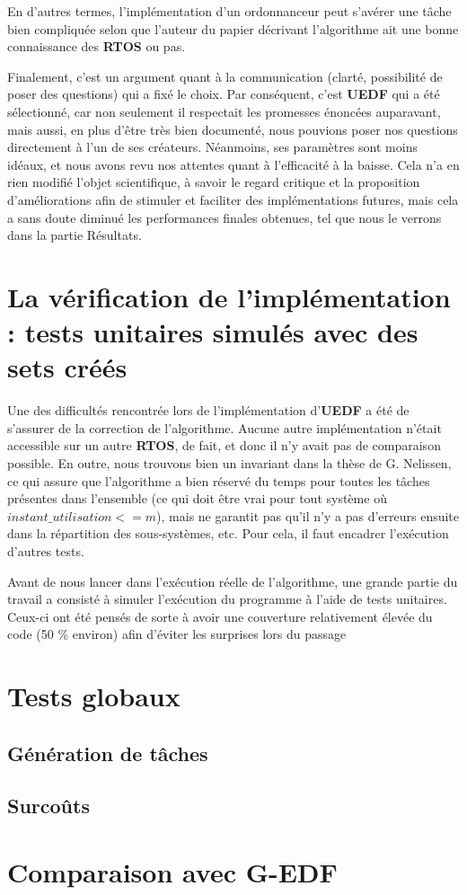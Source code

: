	En d'autres termes, l'implémentation d'un ordonnanceur peut s'avérer une tâche bien compliquée selon que l'auteur du papier décrivant l'algorithme 
	ait une bonne connaissance des \textbf{RTOS} ou pas. 
	\newline

	
	Finalement, c'est un argument quant à la communication (clarté, possibilité de poser des questions) 
	qui a fixé le choix. Par conséquent, c'est \textbf{UEDF} qui a été sélectionné, car 
	non seulement il respectait 
	les promesses énoncées auparavant, mais aussi, en plus d'être très bien documenté, 
	nous pouvions poser nos questions directement à l'un de ses créateurs. Néanmoins, ses paramètres sont moins idéaux, 
	et nous avons revu nos attentes quant à l'efficacité à la baisse. Cela n'a en rien 
	modifié l'objet scientifique, à savoir le regard critique et la proposition d'améliorations 
	afin de stimuler et faciliter des implémentations futures, mais cela a sans doute 
	diminué les performances finales obtenues, tel que nous le verrons dans la partie Résultats.\newline
	

\section{La vérification de l'implémentation : tests unitaires simulés avec des sets créés}

	Une des difficultés rencontrée lors de l'implémentation d'\textbf{UEDF} a été de s'assurer de la correction de l'algorithme. 
	Aucune autre implémentation n'était accessible sur un autre \textbf{RTOS}, de fait, et donc il n'y avait pas de 
	comparaison possible. En outre, nous trouvons bien un invariant dans la thèse de G. Nelissen, ce qui assure 
	que l'algorithme a bien réservé du temps pour toutes les tâches présentes dans l'ensemble 
	(ce qui doit être vrai pour tout système où $instant\_utilisation <= m$), mais ne garantit pas 
	qu'il n'y a pas d'erreurs ensuite dans la répartition des sous-systèmes, etc. Pour cela, il faut encadrer 
	l'exécution d'autres tests. \newline

	Avant de nous lancer dans l'exécution réelle de l'algorithme, une grande partie du travail a consisté 
	à simuler l'exécution du programme à l'aide de tests unitaires. Ceux-ci ont été pensés de sorte à avoir 
	une couverture relativement élevée du code (50 \% environ) afin d'éviter les surprises lors du passage 
	

\section{Tests globaux}

\subsection{Génération de tâches}

\subsection{Surcoûts}

\section{Comparaison avec G-EDF}
